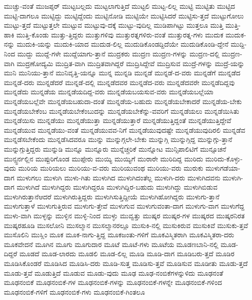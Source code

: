 {ಮುಚ್ಚು-ವಂತೆ
ಮುಜಪ್ಫರ್
ಮುಟ್ಟಬಲ್ಲದು
ಮುಟ್ಟಲಾಗುತ್ತಿದೆ
ಮುಟ್ಟಲಿ
ಮುಟ್ಟ-ಲಿಲ್ಲ
ಮುಟ್ಟಿ
ಮುಟ್ಟಿತು
ಮುಟ್ಟಿದ
ಮುಟ್ಟಿ-ದಾಗಲೂ
ಮುಟ್ಟಿದ್ದು
ಮುಟ್ಟಿದ್ದೆಂದು
ಮುಟ್ಟಿನೋಡಿ
ಮುಟ್ಟಿಯೇ
ಮುಟ್ಟಿಸಿದರೆ
ಮುಟ್ಟಿಸು-ತ್ತದೆ
ಮುಟ್ಟುಗೋಲು
ಮುಟ್ಟು-ತ್ತದೆ
ಮುಟ್ಟುತ್ತಲೇ
ಮುಟ್ಟುವ
ಮುಟ್ಟುವು-ದಕ್ಕೆ
ಮುಟ್ಟು-ವುದಿಲ್ಲ
ಮುಡಿಪಾಗಿಟ್ಟು
ಮುತ್ತಲೂ
ಮುತ್ತಿ
ಮುತ್ತಿ-ಹಾಕಿ
ಮುತ್ತಿ-ಕೊಂಡು
ಮುತ್ತು-ತ್ತಿದ್ದರು
ಮುತ್ತುಗಳಿವು
ಮುತ್ತುರತ್ನಗಳಿರು-ವಂತೆ
ಮುತ್ತುರತ್ನ-ಗಳು
ಮುದುಕ
ಮುದುಕ-ನನ್ನು
ಮುದುಕಿ-ಯನ್ನು
ಮುದುಕಿ-ಯಾದ
ಮುದುಡ-ಲಿಲ್ಲ
ಮುದುಡಿಕೊಂಡದ್ದಿದೆಯೇ
ಮುದುಡಿಕೊಂಡಿ-ದ್ದೇನೆ
ಮುದ್ದಿ-ನಿಂದ
ಮುದ್ದು
ಮುದ್ದೆ-ಗಳೇ
ಮುದ್ದೆಯಾಗು-ತ್ತಾನೆ
ಮುದ್ರಕರು
ಮುದ್ರಣ
ಮುದ್ರಣ-ಗಳನ್ನು
ಮುದ್ರಣ-ದಲ್ಲಿ
ಮುದ್ರಣ-ವಾಗಿ
ಮುದ್ರಣೋದ್ಯಮಿ
ಮುದ್ರಿತ-ವಾಗಿ
ಮುದ್ರಿತವಾಗಿದ್ದರೆ
ಮುದ್ರಿಸಿದ್ದೇವೆ
ಮುದ್ರಿಸುವ
ಮುದ್ರೆ-ಗಳನ್ನು
ಮುದ್ರೆ-ಯನ್ನು
ಮುನಿ
ಮುನಿಯು-ತ್ತಾನೆ
ಮುನಿವೃತ್ತಿ-ಯನ್ನೂ
ಮುನ್ನ
ಮುನ್ನಡಿ
ಮುನ್ನಡೆ
ಮುನ್ನಡೆ-ದ-ವರು
ಮುನ್ನಡೆಗೆ
ಮುನ್ನಡೆದ
ಮುನ್ನಡೆ-ದರು
ಮುನ್ನಡೆದರೆ
ಮುನ್ನಡೆ-ದಲ್ಲಿ
ಮುನ್ನಡೆದವರ
ಮುನ್ನಡೆದ-ವರು
ಮುನ್ನಡೆದವರೇ
ಮುನ್ನಡೆದಿದ್ದವು
ಮುನ್ನಡೆದು
ಮುನ್ನಡೆಯ
ಮುನ್ನಡೆಯದಿದ್ದ-ವರು
ಮುನ್ನಡೆಯಬಯಸುವ-ವರು
ಮುನ್ನಡೆಯಬಲ್ಲೆಯಾ
ಮುನ್ನಡೆಯಬಲ್ಲೆವೇ
ಮುನ್ನಡೆಯಬಹುದಾ-ದಂತೆ
ಮುನ್ನಡೆಯ-ಬಹುದು
ಮುನ್ನಡೆಯಬೇಕಾದರೆ
ಮುನ್ನಡೆಯ-ಬೇಕು
ಮುನ್ನಡೆಯಬೇಕೆಂಬ
ಮುನ್ನಡೆಯಬೇಕೆಂಬುದನ್ನು
ಮುನ್ನಡೆಯಬೇಕೆನ್ನು-ವವರಿಗೆ
ಮುನ್ನಡೆಯಲು
ಮುನ್ನಡೆಯಿಸಿತು
ಮುನ್ನಡೆಯಿಸು
ಮುನ್ನಡೆಯು
ಮುನ್ನಡೆಯುತ್ತಾ
ಮುನ್ನಡೆಯುತ್ತಾರೆ
ಮುನ್ನಡೆಯುತ್ತಿದ್ದಂತೆ
ಮುನ್ನಡೆಯುತ್ತಿದ್ದೇವೆ
ಮುನ್ನಡೆಯುವ
ಮುನ್ನಡೆಯು-ವಂತೆ
ಮುನ್ನಡೆಯುವವ-ನಿಗೆ
ಮುನ್ನಡೆಯುವುದಷ್ಟೇ
ಮುನ್ನಡೆಯುವುದಿರಲಿ
ಮುನ್ನಡೆವ
ಮುನ್ನಡೆಸಬೇಕೆಂದು
ಮುನ್ನಡೆಸಿದವರೂ
ಮುನ್ನು
ಮುನ್ನುಗ್ಗಲೇ-ಬೇಕು
ಮುನ್ನುಗ್ಗಿ
ಮುನ್ನುಗ್ಗಿದ್ದ
ಮುನ್ನುಗ್ಗು-ತ್ತಾನೆ
ಮುನ್ನುಗ್ಗುತ್ತಿದ್ದರು
ಮುನ್ನುಡಿ
ಮುನ್ನೂ
ಮುನ್ನೂರು
ಮುನ್ನೆಚ್ಚರಿಕೆ
ಮುನ್ನೋಟ
ಮುನ್ಸಿಪಾಲಿಟಿಗೆ
ಮುನ್ಸೂಚನೆ
ಮುನ್ಸ್ಟರ್ನಲ್ಲಿನ
ಮುಪ್ಪುರಿಗೊಂಡ
ಮುಪ್ಪೇರು
ಮುಯ್ಯಿ
ಮುಯ್ಯಿಗೆ
ಮುರಾರೇ
ಮುರಿದಿದ್ದ
ಮುರಿದು
ಮುರಿದು-ಕೊಳ್ಳು-ವುದು
ಮುರಿಯ
ಮುರಿಯಲು
ಮುರಿಯು-ವ-ವರು
ಮುರಿಯುವಂಥ
ಮುರಿಯು-ವರು
ಮುರುಕು
ಮುಳುಗಡೆಯಾ-ದಾಗ
ಮುಳುಗಲು
ಮುಳುಗಿ
ಮುಳು-ಗಿತು
ಮುಳುಗಿದ
ಮುಳುಗಿದಂತೆಲ್ಲ
ಮುಳುಗಿ-ದರು
ಮುಳುಗಿದವನು
ಮುಳುಗಿ-ದಾಗ
ಮುಳುಗಿದೆ
ಮುಳುಗಿದ್ದರು
ಮುಳುಗಿದ್ದರೂ
ಮುಳುಗಿದ್ದಿರ-ಬಹುದು
ಮುಳುಗಿದ್ದು
ಮುಳುಗಿಬಿಡುವ
ಮುಳುಗಿರುತ್ತಾನೆಆದರೆ
ಮುಳುಗಿರುತ್ತಿದ್ದರು
ಮುಳುಗಿಸುತ್ತಿದ್ದೀಯೆ
ಮುಳುಗಿಹೋಗಿದ್ದರು
ಮುಳುಗು-ತ್ತಾನೆ
ಮುಳುಗುತ್ತಾಳೆ
ಮುಳುಗುತ್ತಿರುವ
ಮುಳುಗು-ತ್ತೇವೆ
ಮುಳುಗುವ
ಮುಳುಗುವಂತಾ-ದಾಗ
ಮುಳುಗು-ವಾಗ
ಮುಳುಗೆದ್ದ
ಮುಳು-ವಾಗಿ
ಮುಳ್ಳನ್ನು
ಮುಳ್ಳಿನ
ಮುಳ್ಳಿ-ನಿಂದ
ಮುಳ್ಳು
ಮುವ್ವತ್ತು
ಮುಷ್ಕರ
ಮುಷ್ಕರ-ಗಳ
ಮುಷ್ಕರದ
ಮುಷ್ಕರನಿರತ
ಮುಷ್ಕರಹೂಡಿ
ಮುಸಲೋನಿ
ಮುಸಲ್ಮಾನ
ಮುಸಲ್ಮಾನರಲ್ಲೂ
ಮುಸುಕಿ-ನಲ್ಲಿ
ಮುಸುಕಿರುವ
ಮುಸುಕಿವೆ
ಮುಸುಕು-ತ್ತವೆ
ಮುಸೊಲಿನಿ
ಮುಸ್ಲಿಂ
ಮೂಕ
ಮೂಕ-ನಾಗು-ತ್ತಿದ್ದ
ಮೂಕಜಂತು-ಗಳಿಗೆ
ಮೂಕವಿಸ್ಮಿತರಾಗಿ
ಮೂಕವಿಸ್ಮಿತರಾ-ದರು
ಮೂಕವೇದನೆ
ಮೂಗಿನ
ಮೂಗು
ಮೂಗುದಾರ
ಮೂಟೆ
ಮೂಟೆ-ಗಳು
ಮೂಟೆಯ
ಮೂಡಣಬಾನಿ-ನಲ್ಲಿ
ಮೂಡ-ದಿದ್ದರೆ
ಮೂಡದೆ
ಮೂಡ-ಲಾರದು
ಮೂಡಲಿ
ಮೂಡ-ಲಿಲ್ಲ
ಮೂಡಿ
ಮೂಡಿ-ದಾಗ
ಮೂಡಿಬರು-ತ್ತದೆ
ಮೂಡಿರ
ಮೂಡಿಸಿಕೊಂಡರೆ
ಮೂಡಿಸಿದ
ಮೂಡಿಸಿ-ದರು
ಮೂಡಿ-ಸುತ್ತ
ಮೂಡಿಸು-ತ್ತವೆ
ಮೂಡಿಸುವ
ಮೂಡೀತು
ಮೂಡು-ತ್ತದೆ
ಮೂಡು-ತ್ತವೆ
ಮೂಡುತ್ತಿದೆ
ಮೂಡುವ
ಮೂಡು-ವುದು
ಮೂಢ
ಮೂಢ-ನಂಬಿಕೆಗಳನ್ನುಳಿದು
ಮೂಢನಂತೆ
ಮೂಢನಂಬಿಕೆ
ಮೂಢನಂಬಿಕೆ-ಗಳ
ಮೂಢನಂಬಿಕೆ-ಗಳನ್ನು
ಮೂಢನಂಬಿಕೆ-ಗಳನ್ನೇ
ಮೂಢನಂಬಿಕೆ-ಗಳಿಂದ
ಮೂಢನಂಬಿಕೆ-ಗಳಿಗೆ
ಮೂಢನಂಬಿಕೆ-ಗಳು
ಮೂಢನಂಬಿಕೆ-ಗಿಂತಲೂ
}
